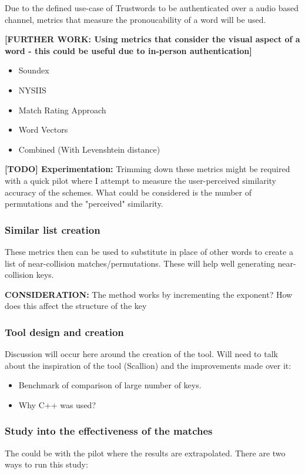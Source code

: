 Due to the defined use-case of Trustwords to be authenticated over a audio based channel, metrics that measure the pronoucability of a word will be used.

\textbf{[FURTHER WORK: Using metrics that consider the visual aspect of a word - this could be useful due to in-person authentication]}

\begin{itemize}
    \item Soundex
    \item NYSIIS
    \item Match Rating Approach
    \item Word Vectors
    \item Combined (With Levenshtein distance)
\end{itemize}

\textbf{[TODO] Experimentation: } Trimming down these metrics might be required with a quick pilot where I attempt to measure the user-perceived similarity accuracy of the schemes. What could be considered is the number of permutations and the "perceived" similarity.

\subsubsection{Similar list creation}
These metrics then can be used to substitute in place of other words to create a list of near-collision matches/permutations. These will help well generating near-collision keys.

\textbf{CONSIDERATION: } The method works by incrementing the exponent? How does this affect the structure of the key

\subsubsection{Tool design and creation}
Discussion will occur here around the creation of the tool. Will need to talk about the inspiration of the tool (Scallion) and the improvements made over it:
\begin{itemize}
    \item Benchmark of comparison of large number of keys.
    \item Why C++ was used?
\end{itemize}

\subsubsection{Study into the effectiveness of the matches}
The could be with the pilot where the results are extrapolated. There are two ways to run this study:

